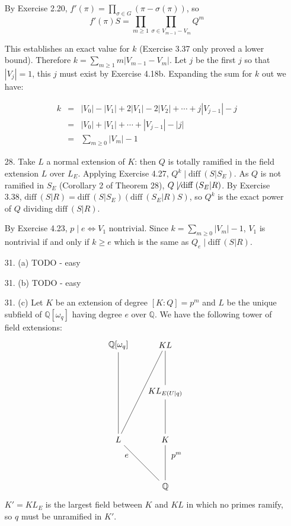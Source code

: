 \documentclass{article}
\newcommand{\w}[0]{\omega}
\newcommand{\Q}[0]{\mathbb{Q}}
\newcommand{\diff}[1]{\text{diff}\ #1}
\begin{document}
\begin{enumerate}
By Exercise 2.20, $f'(\pi) = \prod_{\sigma \in G} (\pi - \sigma(\pi))$, so \[ f'(\pi)S = \prod_{m \ge 1} \prod_{\sigma \in V_{m-1} - V_{m}} Q^{m} \]

This establishes an exact value for $k$ (Exercise 3.37 only proved a lower bound).  Therefore $k = \sum_{m \ge 1} m|V_{m-1} - V_{m}|$.  Let $j$ be the first $j$ so that $|V_j| = 1$, this $j$ must exist by Exercise 4.18b.  Expanding the sum for $k$ out we have:

\begin{eqnarray*}
    k &=& |V_0| - |V_1| + 2|V_1| - 2|V_2| + \cdots + j|V_{j-1}| - j \\
      &=& |V_0| + |V_1| + \cdots + |V_{j-1}| - |j| \\
      &=& \sum_{m \ge 0} |V_m| - 1
\end{eqnarray*}

\item[28.] Take $L$ a normal extension of $K$: then $Q$ is totally ramified in the field extension $L$ over $L_{E}$.  Applying Exercise 4.27, $Q^{k} \mid \diff(S|S_{E})$.  As $Q$ is not ramified in $S_{E}$ (Corollary 2 of Theorem 28), $Q \not\mid \diff(S_{E}|R)$.  By Exercise 3.38, $\diff(S|R) = \diff(S|S_{E})(\diff(S_{E}|R)S)$, so $Q^{k}$ is the exact power of $Q$ dividing $\diff(S|R)$.

By Exercise 4.23, $p \mid e \iff V_1 \text{ nontrivial}$.  Since $k = \sum_{m \ge 0} |V_{m}| - 1$, $V_1$ is nontrivial if and only if $k \ge e$ which is the same as $Q_{e} \mid \diff(S|R)$.


\item[31. (a)] TODO - easy

\item[31. (b)] TODO - easy

\item[31. (c)] Let $K$ be an extension of degree $[K : Q] = p^{m}$ and $L$ be the unique subfield of $\Q[\w_{q}]$ having degree $e$ over $\Q$.  We have the following tower of field extensions:
\[
\begin{tikzpicture}
    \node (QBase) at (0,0) {$\Q$};
    \node (QK) at (0,2) {$K$};
    \node (QL) at (-2,2) {$L$};
    \node (QKprime) at (0,4) {$KL_{E(U|q)}$};
    \node (QKL) at (0,6) {$KL$};
    \node (Qwq) at (-2,6) {$\Q[\w_q]$};

    \draw (QBase)--(QK) node [pos=0.7, right,inner sep=0.25cm] {$p^{m}$};
    \draw (QBase)--(QL) node [pos=0.7, left,inner sep=0.25cm] {$e$};
    \draw (QL)--(Qwq);
    \draw (QL)--(QKL);
    \draw (QK)--(QKprime);
    \draw (QKprime)--(QKL);
    \end{tikzpicture}
\]
$K' = KL_{E}$ is the largest field between $K$ and $KL$ in which no primes ramify, so $q$ must be unramified in $K'$.


\end{enumerate}
\end{document}
